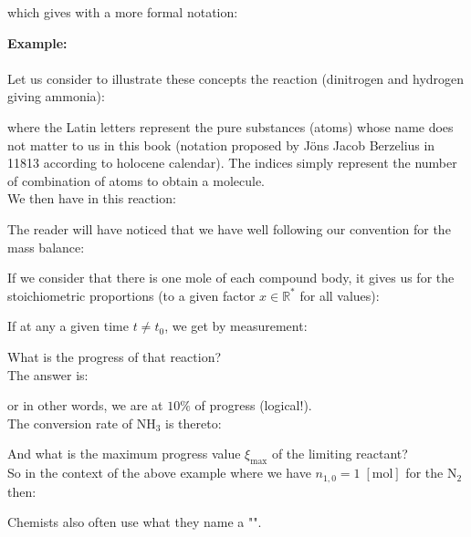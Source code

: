 	which gives with a more formal notation:
	
	\begin{tcolorbox}[colframe=black,colback=white,sharp corners,breakable]
	\textbf{{\Large {}}Example:}\\\\
	Let us consider to illustrate these concepts the reaction (dinitrogen and hydrogen giving ammonia):
	
	where the Latin letters represent the pure substances (atoms) whose name does not matter to us in this book (notation proposed by Jöns Jacob Berzelius in 11813 according to holocene calendar). The indices simply represent the number of combination of atoms to obtain a molecule. \\

	We then have in this reaction:
	
	The reader will have noticed that we have well following our convention for the mass balance:
	
	If we consider that there is one mole of each compound body, it gives us for the stoichiometric proportions (to a given factor $x\in\mathbb{R}^{*}$ for all values):
	
	If at any a given time $t\neq t_0$, we get by measurement:
	
	What is the progress of that reaction?\\

	The answer is:
	
	or in other words, we are at $10\%$ of progress (logical!).\\
	
	The conversion rate of $\mathrm{NH}_3$ is thereto:
	
	And what is the maximum progress value $\xi_{\max}$ of the limiting reactant?\\

	So in the context of the above example where we have $n_{1,0}=1\;[\text{mol}]$ for the $\mathrm{N}_2$ then:
	
	\end{tcolorbox}
	
	Chemists also often use what they name a "".
	
